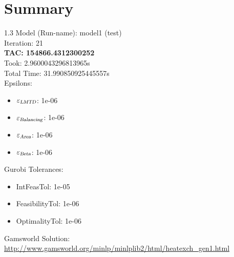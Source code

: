 \documentclass{article}%
\begin{document}
%
\normalsize%
\section{Summary}%
\thispagestyle{plain}%
\begin{spacing}{1.3}%
\Large%
Model (Run-name): model1 (test)\\%
Iteration: 21\\%
\textbf{TAC: 154866.4312300252}\\%
Took: 2.9600043296813965s\\%
Total Time: 31.990850925445557s\\%
Epsilons:%
\begin{itemize}%
	\item $\varepsilon_{\textsl{LMTD}}$: 1e-06%
	\item $\varepsilon_{\textsl{Balancing}}$: 1e-06%
	\item $\varepsilon_{\textsl{Area}}$: 1e-06%
	\item $\varepsilon_{\textsl{Beta}}$: 1e-06%
\end{itemize}%
Gurobi Tolerances:%
\begin{itemize}%
	\item IntFeasTol: 1e-05%
	\item FeasibilityTol: 1e-06%
	\item OptimalityTol: 1e-06%
\end{itemize}%
\end{spacing}%
\normalsize%
Gamsworld Solution: \url{http://www.gamsworld.org/minlp/minlplib2/html/heatexch_gen1.html}%
%
\clearpage%
\end{document}
